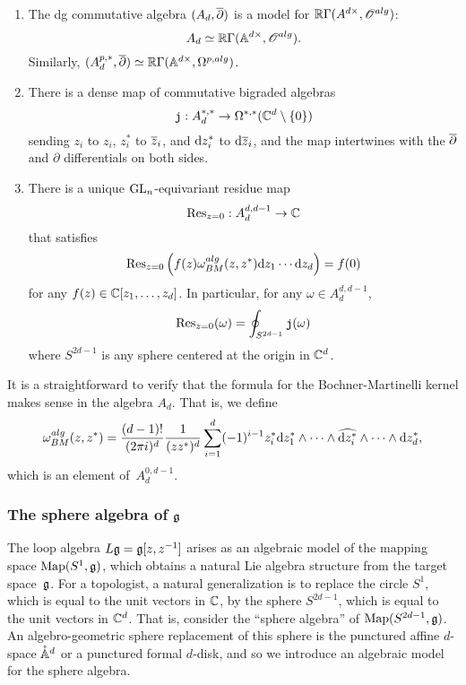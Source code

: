 \begin{prop}
\label{prop: Ad} $\;$
\begin{enumerate}
\item
The dg commutative algebra $(A_d,\dbar)$ is a model for $\RR \Gamma(A^{d\times}, \sO^{alg})$:
\[
A_d \simeq \RR\Gamma(\AA^{d \times}, \sO^{alg}) .
\]
Similarly, $(A_d^{p,*},\dbar) \simeq \RR \Gamma(\AA^{d\times}, \Omega^{p,alg})$.
\item There is a dense map of commutative bigraded algebras
\[
\jou : A^{*,*}_d \to \Omega^{*,*}(\CC^d \setminus \{0\}) 
\]
sending $z_i$ to $z_i$, $z_i^*$ to $\Bar{z}_i$, and $\d z_i^*$ to $\d \zbar_i$, and the map intertwines with the $\dbar$ and $\partial$ differentials on both sides.
\item There is a unique $\GL_n$-equivariant residue map
\[
{\rm Res}_{z=0} : A_d^{d,d-1} \to \CC
\]
that satisfies
\[
\Res_{z=0} \left(f(z) \omega_{BM}^{alg}(z,z^*) \d z_1 \cdots \d z_d\right) = f(0)
\]
for any $f (z) \in \CC[z_1,\ldots,z_d]$. 
In particular, for any $\omega \in A^{d,d-1}_d$,
\[
{\rm Res}_{z=0} (\omega) = \oint_{S^{2d-1}} \jou(\omega)
\]
where $S^{2d-1}$ is any sphere centered at the origin in $\CC^d$. 
\end{enumerate}
\end{prop}

It is a straightforward to verify that the formula for the Bochner-Martinelli kernel makes sense in the algebra $A_d$.
That is, we define
\[
\omega_{BM}^{alg} (z,z^*) = \frac{(d-1)!}{(2 \pi i)^d} \frac{1}{(zz^*)^d} \sum_{i=1}^d (-1)^{i-1} z_i^* \d z_1^* \wedge \cdots \wedge \Hat{\d z_i^*} \wedge \cdots \wedge \d z_d^*,
\]
which is an element of~$A_d^{0,d-1}$. 

\subsubsection{The sphere algebra of $\fg$}

The loop algebra $L\fg = \fg[z,z^{-1}]$ arises as an algebraic model of the mapping space $\Map(S^1,\fg)$,
which obtains a natural Lie algebra structure from the target space~$\fg$.
For a topologist, a natural generalization is to replace the circle $S^1$, which is equal to the unit vectors in $\CC$, by the sphere $S^{2d-1}$, which is equal to the unit vectors in $\CC^d$.
That is, consider the ``sphere algebra'' of $\Map(S^{2d-1},\fg)$.
An algebro-geometric sphere replacement of this sphere is the punctured affine $d$-space $\pAA^{d}$ or a punctured formal $d$-disk,
and so we introduce an algebraic model for the sphere algebra.

